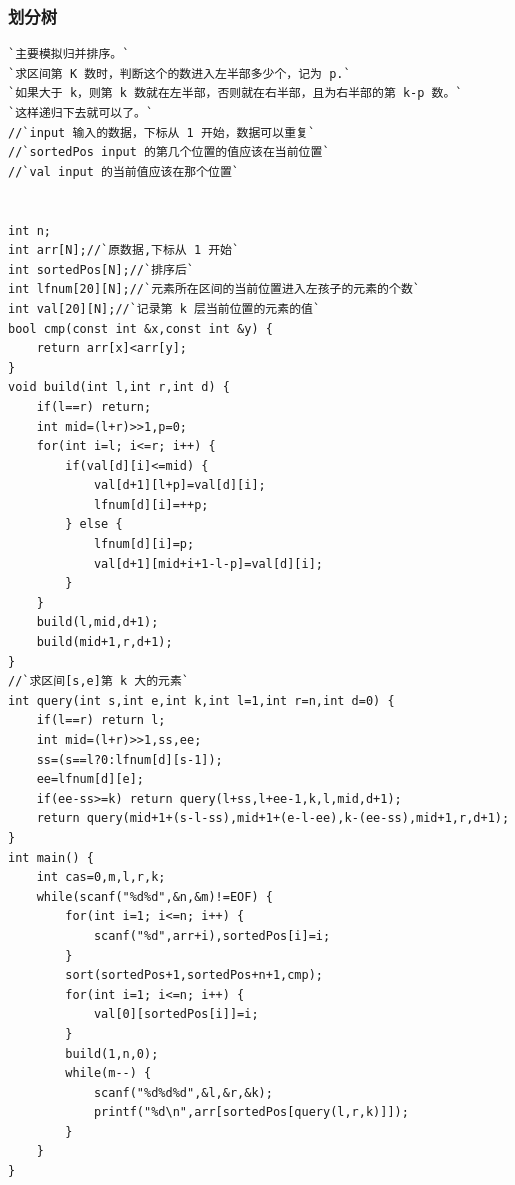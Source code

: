 \documentclass[a4paper]{article}
\begin{document}
\begin{CJK*}{UTF8}{gbsn}
\begin{multicols}{3}
\begin{flushleft}
\subsubsection{划分树}
\begin{lstlisting}
`主要模拟归并排序。`
`求区间第 K 数时，判断这个的数进入左半部多少个，记为 p.`
`如果大于 k，则第 k 数就在左半部，否则就在右半部，且为右半部的第 k-p 数。`
`这样递归下去就可以了。`
//`input 输入的数据，下标从 1 开始，数据可以重复`
//`sortedPos input 的第几个位置的值应该在当前位置`
//`val input 的当前值应该在那个位置`


int n;
int arr[N];//`原数据,下标从 1 开始`
int sortedPos[N];//`排序后`
int lfnum[20][N];//`元素所在区间的当前位置进入左孩子的元素的个数`
int val[20][N];//`记录第 k 层当前位置的元素的值`
bool cmp(const int &x,const int &y) {
    return arr[x]<arr[y];
}
void build(int l,int r,int d) {
    if(l==r) return;
    int mid=(l+r)>>1,p=0;
    for(int i=l; i<=r; i++) {
        if(val[d][i]<=mid) {
            val[d+1][l+p]=val[d][i];
            lfnum[d][i]=++p;
        } else {
            lfnum[d][i]=p;
            val[d+1][mid+i+1-l-p]=val[d][i];
        }
    }
    build(l,mid,d+1);
    build(mid+1,r,d+1);
}
//`求区间[s,e]第 k 大的元素`
int query(int s,int e,int k,int l=1,int r=n,int d=0) {
    if(l==r) return l;
    int mid=(l+r)>>1,ss,ee;
    ss=(s==l?0:lfnum[d][s-1]);
    ee=lfnum[d][e];
    if(ee-ss>=k) return query(l+ss,l+ee-1,k,l,mid,d+1);
    return query(mid+1+(s-l-ss),mid+1+(e-l-ee),k-(ee-ss),mid+1,r,d+1);
}
int main() {
    int cas=0,m,l,r,k;
    while(scanf("%d%d",&n,&m)!=EOF) {
        for(int i=1; i<=n; i++) {
            scanf("%d",arr+i),sortedPos[i]=i;
        }
        sort(sortedPos+1,sortedPos+n+1,cmp);
        for(int i=1; i<=n; i++) {
            val[0][sortedPos[i]]=i;
        }
        build(1,n,0);
        while(m--) {
            scanf("%d%d%d",&l,&r,&k);
            printf("%d\n",arr[sortedPos[query(l,r,k)]]);
        }
    }
}
\end{lstlisting}


\end{flushleft}
\end{multicols}
\end{CJK*}
\end{document}
